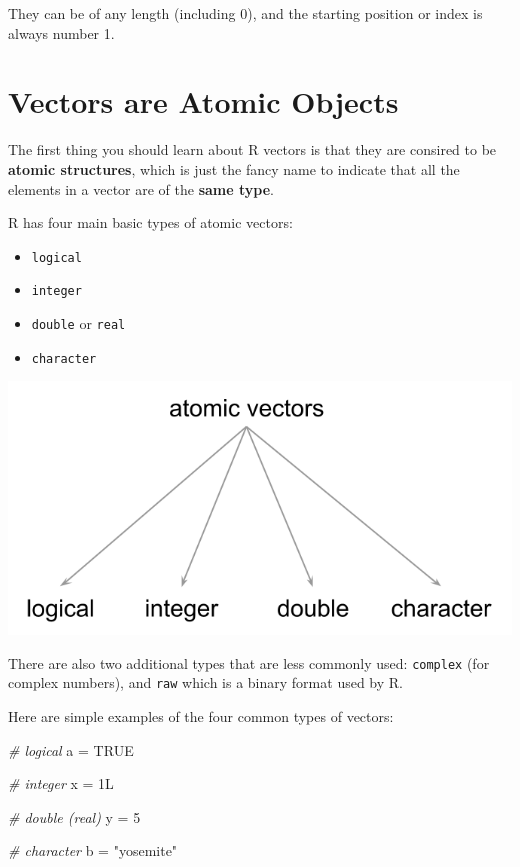 \documentclass[
]{book}
\newenvironment{Shaded}{\begin{snugshade}}{\end{snugshade}}
\newcommand{\CommentTok}[1]{\textcolor[rgb]{0.56,0.35,0.01}{\textit{#1}}}
\newcommand{\ConstantTok}[1]{\textcolor[rgb]{0.00,0.00,0.00}{#1}}
\newcommand{\DecValTok}[1]{\textcolor[rgb]{0.00,0.00,0.81}{#1}}
\newcommand{\NormalTok}[1]{#1}
\newcommand{\OtherTok}[1]{\textcolor[rgb]{0.56,0.35,0.01}{#1}}
\newcommand{\StringTok}[1]{\textcolor[rgb]{0.31,0.60,0.02}{#1}}
\providecommand{\tightlist}{%
  \setlength{\itemsep}{0pt}\setlength{\parskip}{0pt}}
\begin{document}
They can be of any length (including 0), and the starting position or index is
always number 1.

\hypertarget{vectors-are-atomic-objects}{%
\section{Vectors are Atomic Objects}\label{vectors-are-atomic-objects}}

The first thing you should learn about R vectors is that they are consired to
be \textbf{atomic structures}, which is just the fancy name to indicate that all the
elements in a vector are of the \textbf{same type}.

R has four main basic types of atomic vectors:

\begin{itemize}
\tightlist
\item
  \texttt{logical}
\item
  \texttt{integer}
\item
  \texttt{double} or \texttt{real}
\item
  \texttt{character}
\end{itemize}

\begin{center}\includegraphics[width=0.55\linewidth]{images/objects/obj-vector-atomic-types} \end{center}

There are also two additional types that are less commonly used: \texttt{complex}
(for complex numbers), and \texttt{raw} which is a binary format used by R.

Here are simple examples of the four common types of vectors:

\begin{Shaded}
\begin{Highlighting}[]
\CommentTok{\# logical}
\NormalTok{a }\OtherTok{=} \ConstantTok{TRUE}

\CommentTok{\# integer}
\NormalTok{x }\OtherTok{=}\NormalTok{ 1L}

\CommentTok{\# double (real)}
\NormalTok{y }\OtherTok{=} \DecValTok{5}

\CommentTok{\# character}
\NormalTok{b }\OtherTok{=} \StringTok{"yosemite"}
\end{Highlighting}
\end{Shaded}
\end{document}
